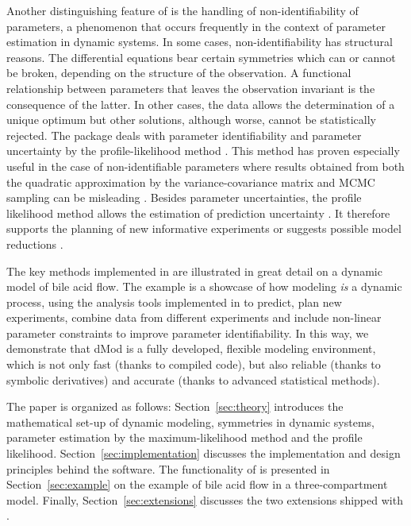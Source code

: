 \documentclass[article]{jss}
\begin{document}
Another distinguishing feature of  is the handling of non-identifiability of parameters, a phenomenon that occurs frequently in the context of parameter estimation in dynamic systems.
In some cases, non-identifiability has structural reasons. The differential equations bear certain symmetries which can or cannot be broken, depending on the structure of the observation. A functional relationship between parameters that leaves the observation invariant is the consequence of the latter. In other cases, the data allows the determination of a unique optimum but other solutions, although worse, cannot be statistically rejected. The  package deals with parameter identifiability and parameter uncertainty by the profile-likelihood method \citep{murphy2000profile, raue2009structural, kreutz2013profile}. This method has proven especially useful in the case of non-identifiable parameters where results obtained from both the quadratic approximation by the variance-covariance matrix and MCMC sampling can be misleading \citep{raue2013joining}. Besides parameter uncertainties, the profile likelihood method allows the estimation of prediction uncertainty \citep{kreutz2012likelihood}. It therefore supports the planning of new informative experiments \citep{raue2011addressing} or suggests possible model reductions \citep{maiwald2016driving}.

The key methods implemented in  are illustrated in great detail on a dynamic model of bile acid flow. The example is a showcase of how modeling \textit{is} a dynamic process, using the analysis tools implemented in  to predict, plan new experiments, combine data from different experiments and include non-linear parameter constraints to improve parameter identifiability. In this way, we demonstrate that dMod is a fully developed, flexible modeling environment, which is not only fast (thanks to compiled code), but also reliable (thanks to symbolic derivatives) and accurate (thanks to advanced statistical methods). 

The paper is organized as follows: Section~\ref{sec:theory} introduces the mathematical set-up of dynamic modeling, symmetries in dynamic systems, parameter estimation by the maximum-likelihood method and the profile likelihood. Section~\ref{sec:implementation} discusses the implementation and design principles behind the  software. The functionality of  is presented in Section~\ref{sec:example} on the example of bile acid flow in a three-compartment model. Finally, Section~\ref{sec:extensions} discusses the two  extensions shipped with .
\end{document}
